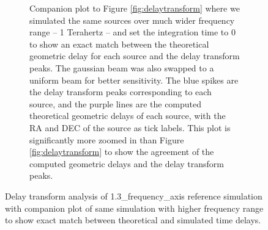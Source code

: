 \documentclass{article}
\begin{document}
\begin{figure}[htbp]
\begin{subfigure}[b]{1.0\textwidth}
        \caption{Companion plot to Figure \ref{fig:delaytransform} where we simulated the same sources over much wider frequency range -- 1 Terahertz -- and set the integration time to 0 to show an exact match between the theoretical geometric delay for each source and the delay transform peaks. The gaussian beam was also swapped to a uniform beam for better sensitivity. The blue spikes are the delay transform peaks corresponding to each source, and the purple lines are the computed theoretical geometric delays of each source, with the RA and DEC of the source as tick labels. This plot is significantly more zoomed in than Figure \ref{fig:delaytransform} to show the agreement of the computed geometric delays and the delay transform peaks.}
        \label{fig:theorydelay}
    \end{subfigure}
    \caption{Delay transform analysis of 1.3\_frequency\_axis reference simulation with companion plot of same simulation with higher frequency range to show exact match between theoretical and simulated time delays.}
    \label{fig:theorydelays}
\end{figure}
\end{document}
